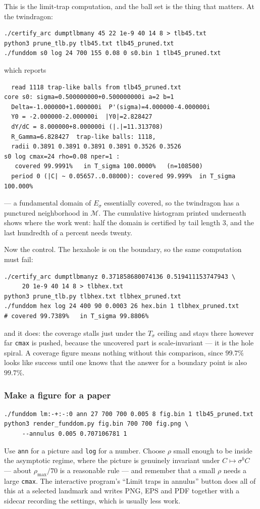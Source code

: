 \documentclass{amsart}
\begin{document}
This is the limit-trap computation, and the ball set is the thing that matters.  At the twindragon:
\begin{verbatim}
./certify_arc dumptlbmany 45 22 1e-9 40 14 8 > tlb45.txt
python3 prune_tlb.py tlb45.txt tlb45_pruned.txt
./funddom s0 log 24 700 155 0.08 0 s0.bin 1 tlb45_pruned.txt
\end{verbatim}
which reports
\begin{verbatim}
  read 1118 trap-like balls from tlb45_pruned.txt
core s0: sigma=0.500000000+0.500000000i a=2 b=1
  Delta=-1.000000+1.000000i  P'(sigma)=4.000000-4.000000i
  Y0 = -2.000000-2.000000i  |Y0|=2.828427
  dY/dC = 8.000000+8.000000i (|.|=11.313708)
  R_Gamma=6.828427  trap-like balls: 1118,
  radii 0.3891 0.3891 0.3891 0.3891 0.3526 0.3526
s0 log cmax=24 rho=0.08 nper=1 :
   covered 99.9991%   in T_sigma 100.0000%   (n=108500)
  period 0 (|C| ~ 0.05657..0.08000): covered 99.999%  in T_sigma 100.000%
\end{verbatim}
--- a fundamental domain of $E_\sigma$ essentially covered, so the twindragon has a punctured
neighborhood in $\mathcal{M}$.  The cumulative histogram printed underneath shows where the work
went: half the domain is certified by tail length $3$, and the last hundredth of a percent needs
twenty.

Now the control.  The hexahole is on the boundary, so the same computation must fail:
\begin{verbatim}
./certify_arc dumptlbmanyz 0.371858680074136 0.519411153747943 \
     20 1e-9 40 14 8 > tlbhex.txt
python3 prune_tlb.py tlbhex.txt tlbhex_pruned.txt
./funddom hex log 24 400 90 0.0003 26 hex.bin 1 tlbhex_pruned.txt
# covered 99.7389%   in T_sigma 99.8806%
\end{verbatim}
and it does: the coverage stalls just under the $T_\sigma$ ceiling and stays there however far
\texttt{cmax} is pushed, because the uncovered part is scale-invariant --- it is the hole spiral.
A coverage figure means nothing without this comparison, since $99.7\%$ looks like success until
one knows that the answer for a boundary point is also $99.7\%$.

\subsubsection{Make a figure for a paper}

\begin{verbatim}
./funddom lm:-+:-:0 ann 27 700 700 0.005 8 fig.bin 1 tlb45_pruned.txt
python3 render_funddom.py fig.bin 700 700 fig.png \
     --annulus 0.005 0.707106781 1
\end{verbatim}
Use \texttt{ann} for a picture and \texttt{log} for a number.  Choose $\rho$ small enough to be
inside the asymptotic regime, where the picture is genuinely invariant under
$C \mapsto \sigma^bC$ --- about $\rho_{\max}/70$ is a reasonable rule --- and remember that a
small $\rho$ needs a large \texttt{cmax}.  The interactive program's ``Limit traps in annulus''
button does all of this at a selected landmark and writes PNG, EPS and PDF together with a sidecar
recording the settings, which is usually less work.
\end{document}
